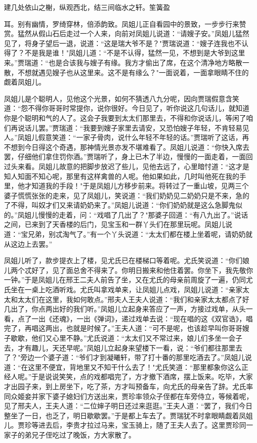建几处依山之榭，纵观西北，结三间临水之轩。笙簧盈

耳。别有幽情，罗绮穿林，倍添韵致。凤姐儿正自看园中的景致，一步步行来赞赏。猛然从假山石后走过一个人来，向前对凤姐儿说道：“请嫂子安。”凤姐儿猛然见了，将身子望后一退，说道：“这是瑞大爷不是？"贾瑞说道：“嫂子连我也不认得了？不是我是谁！"凤姐儿道：“不是不认得，猛然一见，不想到是大爷到这里来。”贾瑞道：“也是合该我与嫂子有缘。我方才偷出了席，在这个清净地方略散一散，不想就遇见嫂子也从这里来。这不是有缘么？"一面说着，一面拿眼睛不住的觑着凤姐儿。

凤姐儿是个聪明人，见他这个光景，如何不猜透八九分呢，因向贾瑞假意含笑道：“怨不得你哥哥时常提你，说你很好。今日见了，听你说这几句话儿，就知道你是个聪明和气的人了。这会子我要到太太们那里去，不得和你说话儿，等闲了咱们再说话儿罢。”贾瑞道：“我要到嫂子家里去请安，又恐怕嫂子年轻，不肯轻易见人。”凤姐儿假意笑道：“一家子骨肉，说什么年轻不年轻的话。”贾瑞听了这话，再不想到今日得这个奇遇，那神情光景亦发不堪难看了。凤姐儿说道：“你快入席去罢，仔细他们拿住罚你酒。”贾瑞听了，身上已木了半边，慢慢的一面走着，一面回过头来看。凤姐儿故意的把脚步放迟了些儿，见他去远了，心里暗忖道：“这才是知人知面不知心呢，那里有这样禽兽的人呢。他如果如此，几时叫他死在我的手里，他才知道我的手段！"于是凤姐儿方移步前来。将转过了一重山坡，见两三个婆子慌慌张张的走来，见了凤姐儿，笑说道：“我们奶奶见二奶奶只是不来，急的了不得，叫奴才们又来请奶奶来了。”凤姐儿说道：“你们奶奶就是这么急脚鬼似的。”凤姐儿慢慢的走着，问：“戏唱了几出了？"那婆子回道：“有八九出了。”说话之间，已来到了天香楼的后门，见宝玉和一群丫头们在那里玩呢。凤姐儿说道：“宝兄弟，别忒淘气了。”有一个丫头说道：“太太们都在楼上坐着呢，请奶奶就从这边上去罢。”

凤姐儿听了，款步提衣上了楼，见尤氏已在楼梯口等着呢。尤氏笑说道：“你们娘儿两个忒好了，见了面总舍不得来了。你明日搬来和他住着罢。你坐下，我先敬你一钟。”于是凤姐儿在邢王二夫人前告了坐，又在尤氏的母亲前周旋了一遍，仍同尤氏坐在一桌上吃酒听戏。尤氏叫拿戏单来，让凤姐儿点戏，凤姐儿说道：“亲家太太和太太们在这里，我如何敢点。”邢夫人王夫人说道：“我们和亲家太太都点了好几出了，你点两出好的我们听。”凤姐儿立起身来答应了一声，方接过戏单，从头一看，点了一出《还魂》，一出《弹词》，递过戏单去说：“现在唱的这《双官诰》，唱完了，再唱这两出，也就是时候了。”王夫人道：“可不是呢，也该趁早叫你哥哥嫂子歇歇，他们又心里不静。”尤氏说道：“太太们又不常过来，娘儿们多坐一会子去，才有趣儿，天还早呢。”凤姐儿立起身来望楼下一看，说：“爷们都往那里去了？"旁边一个婆子道：“爷们才到凝曦轩，带了打十番的那里吃酒去了。”凤姐儿说道：“在这里不便宜，背地里又不知干什么去了！"尤氏笑道：“那里都象你这么正经人呢。”于是说说笑笑，点的戏都唱完了，方才撤下酒席，摆上饭来。吃毕，大家才出园子来，到上房坐下，吃了茶，方才叫预备车，向尤氏的母亲告了辞。尤氏率同众姬妾并家下婆子媳妇们方送出来，贾珍率领众子侄都在车旁侍立，等候着呢，见了邢夫人，王夫人道：“二位婶子明日还过来逛逛。”王夫人道：“罢了，我们今日整坐了一日，也乏了，明日歇歇罢。”于是都上车去了。贾瑞犹不时拿眼睛觑着凤姐儿。贾珍等进去后，李贵才拉过马来，宝玉骑上，随了王夫人去了。这里贾珍同一家子的弟兄子侄吃过了晚饭，方大家散了。

